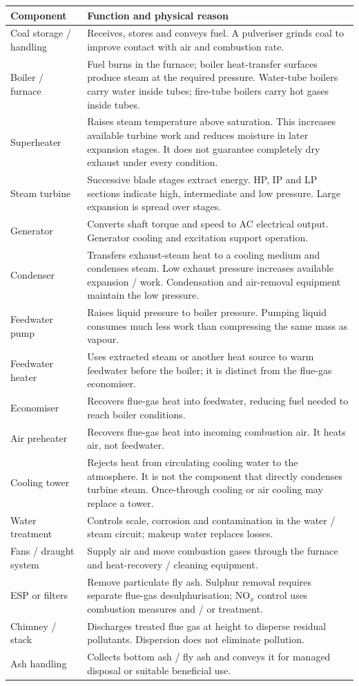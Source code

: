 \documentclass[11pt,a4paper]{article}
\begin{document}
\begin{longtable}{L{3.6cm}L{11.8cm}}
\toprule\textbf{Component} & \textbf{Function and physical reason}\\\midrule\endhead
Coal storage / handling & Receives, stores and conveys fuel. A pulveriser grinds coal to improve contact with air and combustion rate.\\
Boiler / furnace & Fuel burns in the furnace; boiler heat-transfer surfaces produce steam at the required pressure. Water-tube boilers carry water inside tubes; fire-tube boilers carry hot gases inside tubes.\\
Superheater & Raises steam temperature above saturation. This increases available turbine work and reduces moisture in later expansion stages. It does not guarantee completely dry exhaust under every condition.\\
Steam turbine & Successive blade stages extract energy. HP, IP and LP sections indicate high, intermediate and low pressure. Large expansion is spread over stages.\\
Generator & Converts shaft torque and speed to AC electrical output. Generator cooling and excitation support operation.\\
Condenser & Transfers exhaust-steam heat to a cooling medium and condenses steam. Low exhaust pressure increases available expansion / work. Condensation and air-removal equipment maintain the low pressure.\\
Feedwater pump & Raises liquid pressure to boiler pressure. Pumping liquid consumes much less work than compressing the same mass as vapour.\\
Feedwater heater & Uses extracted steam or another heat source to warm feedwater before the boiler; it is distinct from the flue-gas economiser.\\
Economiser & Recovers flue-gas heat into feedwater, reducing fuel needed to reach boiler conditions.\\
Air preheater & Recovers flue-gas heat into incoming combustion air. It heats air, not feedwater.\\
Cooling tower & Rejects heat from circulating cooling water to the atmosphere. It is not the component that directly condenses turbine steam. Once-through cooling or air cooling may replace a tower.\\
Water treatment & Controls scale, corrosion and contamination in the water / steam circuit; makeup water replaces losses.\\
Fans / draught system & Supply air and move combustion gases through the furnace and heat-recovery / cleaning equipment.\\
ESP or filters & Remove particulate fly ash. Sulphur removal requires separate flue-gas desulphurisation; NO$_x$ control uses combustion measures and / or treatment.\\
Chimney / stack & Discharges treated flue gas at height to disperse residual pollutants. Dispersion does not eliminate pollution.\\
Ash handling & Collects bottom ash / fly ash and conveys it for managed disposal or suitable beneficial use.\\\bottomrule
\end{longtable}
\end{document}
